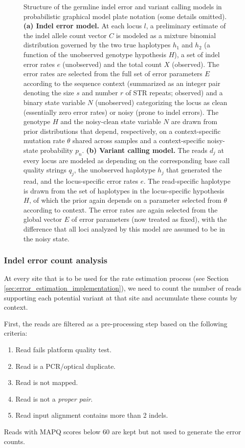 \documentclass{article}
\begin{document}
\begin{figure}
\caption{Structure of the germline indel error and variant calling models in probabilistic graphical model plate notation (some details omitted). {\bf (a) Indel error model.} At each locus $l$, a preliminary estimate of the indel allele count vector $C$ is modeled as a mixture binomial distribution governed by the two true haplotypes $h_1$ and $h_2$ (a function of the unobserved genotype hypothesis $H$), a set of indel error rates $e$ (unobserved) and the total count $X$ (observed). The error rates are selected from the full set of error parameters $E$ according to the sequence context (summarized as an integer pair denoting the size $s$ and number $r$ of STR repeats; observed) and a binary state variable $N$ (unobserved) categorizing the locus as clean (essentially zero error rates) or noisy (prone to indel errors). The genotype $H$ and the noisy-clean state variable $N$ are drawn from prior distributions that depend, respectively, on a context-specific mutation rate $\theta$ shared across samples and a context-specific noisy-state probability $p_n$. {\bf (b) Variant calling model.} The reads $d_j$ at every locus are modeled as depending on the corresponding base call quality strings $q_j$, the unobserved haplotype $h_j$ that generated the read, and the locus-specific error rates $e$. The read-specific haplotype is drawn from the set of haplotypes in the locus-specific hypothesis $H$, of which the prior again depends on a parameter selected from $\theta$ according to context. The error rates are again selected from the global vector $E$ of error parameters (now treated as fixed), with the difference that all loci analyzed by this model are assumed to be in the noisy state.}
\end{figure}

\subsubsection{Indel error count analysis}
At every site that is to be used for the rate estimation process (see Section \ref{sec:error_estimation_implementation}), we need to count the number of reads supporting each potential variant at that site and accumulate these counts by context.

First, the reads are filtered as a pre-processing step based on the following criteria:
    \begin{enumerate}
        \item Read fails platform quality test.
        \item Read is a PCR/optical duplicate.
        \item Read is not mapped.
        \item Read is not a \emph{proper pair}.
        \item Read input alignment contains more than 2 indels.
    \end{enumerate}
Reads with MAPQ scores below 60 are kept but not used to generate the error counts.
\end{document}
